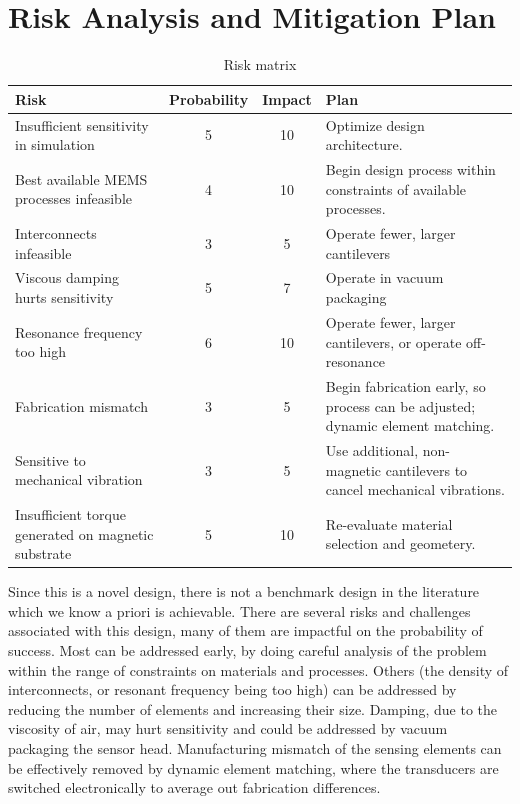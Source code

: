 \section{Risk Analysis and Mitigation Plan}

\begin{table}[h!]
\centering
\begin{tabularx}{.85\textwidth}{|X||c|c|X|}
    \hline
    Risk & Probability & Impact & Plan\\
    \hline
    \hline
    Insufficient sensitivity in simulation & 5 & 10 & Optimize design architecture. \\
    \hline
    Best available MEMS processes infeasible & 4 & 10 & Begin design process within constraints of available processes. \\
    \hline
    Interconnects infeasible & 3 & 5 & Operate fewer, larger cantilevers \\
    \hline
    Viscous damping hurts sensitivity & 5 & 7 & Operate in vacuum packaging \\
    \hline
    Resonance frequency too high & 6  & 10 & Operate fewer, larger cantilevers, or operate off-resonance \\
    \hline
    Fabrication mismatch & 3 & 5 & Begin fabrication early, so process can be adjusted; dynamic element matching. \\
    \hline
    Sensitive to mechanical vibration & 3 & 5 & Use additional, non-magnetic cantilevers to cancel mechanical vibrations. \\
    \hline
    Insufficient torque generated on magnetic substrate & 5 & 10 & Re-evaluate material selection and geometery. \\
    \hline
\end{tabularx}
\caption{Risk matrix}
\label{table:risk}
\end{table}

Since this is a novel design, there is not a benchmark design in the literature which we know a priori is achievable. There are several risks and challenges associated with this design, many of them are impactful on the probability of success. Most can be addressed early, by doing careful analysis of the problem within the range of constraints on materials and processes. Others (the density of interconnects, or resonant frequency being too high) can be addressed by reducing the number of elements and increasing their size. Damping, due to the viscosity of air, may hurt sensitivity and could be addressed by vacuum packaging the sensor head. Manufacturing mismatch of the sensing elements can be effectively removed by dynamic element matching, where the transducers are switched electronically to average out fabrication differences.

